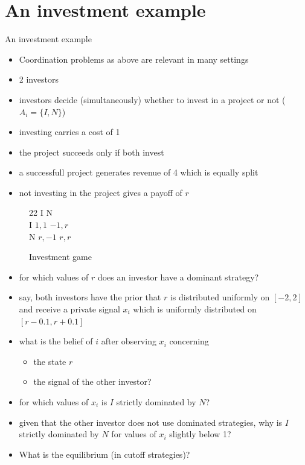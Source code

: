 \documentclass[bigger,allowframebreaks]{beamer}
\begin{document}
\section{An investment example}
\label{sec-2}
\begin{frame}[allowframebreaks,label=]{An investment example}
\begin{itemize}
\item Coordination problems as above are relevant in many settings
\item 2 investors
\item investors decide (simultaneously) whether to invest in a project or not ($A_i=\{I,N\}$)
\item investing carries a cost of 1
\item the project succeeds only if both invest
\item a successfull project generates revenue of 4 which is equally split
\item not investing in the project gives a payoff of $r$
\end{itemize}
\begin{figure}[h]
       \centering
      \begin{game}{2}{2}
             \>  I \> N\\
       I  \> $1,1$ \> $-1,r$\\
       N   \> $r,-1$ \> $r,r$
      \end{game}
     \caption{Investment game}
   \end{figure}

\begin{itemize}
\item for which values of $r$ does an investor have a dominant strategy?
\item say, both investors have the prior that $r$ is distributed uniformly on $[-2,2]$ and receive a private signal $x_i$ which is uniformly distributed on $[r-0.1,r+0.1]$
\item what is the belief of $i$ after observing $x_i$ concerning 
\begin{itemize}
\item the state $r$
\item the signal of the other investor?
\end{itemize}
\item for which values of $x_i$ is $I$ strictly dominated by $N$?
\item given that the other investor does not use dominated strategies, why is $I$ strictly dominated by $N$ for values of $x_i$ slightly below 1?
\item What is the equilibrium (in cutoff strategies)?
\end{itemize}
\end{frame}
\end{document}
